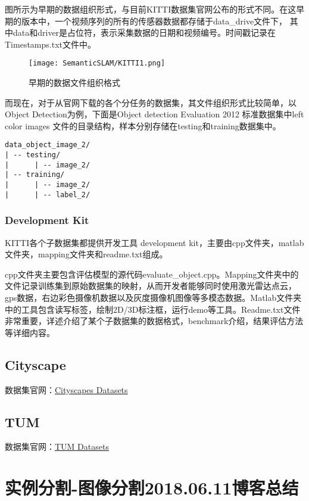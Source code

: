 图所示为早期的数据组织形式，与目前KITTI数据集官网公布的形式不同。在这早期的版本中，一个视频序列的所有的传感器数据都存储于data\_drive文件下， 其中data和driver是占位符，表示采集数据的日期和视频编号。时间戳记录在Timestamps.txt文件中。

\begin{figure}[!hbtp]
\centering
\texttt{[image: SemanticSLAM/KITTI1.png]}
\caption{早期的数据文件组织格式}
\label{KITTI1}
\end{figure}

而现在，对于从官网下载的各个分任务的数据集，其文件组织形式比较简单，以Object Detection为例，下面是Object detection Evaluation 2012 标准数据集中left color images 文件的目录结构，样本分别存储在testing和training数据集中。

\begin{verbatim}
data_object_image_2/
| -- testing/
|      | -- image_2/
| -- training/
|      | -- image_2/
|      | -- label_2/
\end{verbatim}

\subsubsection{Development Kit}

KITTI各个子数据集都提供开发工具 development kit，主要由cpp文件夹，matlab文件夹，mapping文件夹和readme.txt组成。

cpp文件夹主要包含评估模型的源代码evaluate\_object.cpp。Mapping文件夹中的文件记录训练集到原始数据集的映射，从而开发者能够同时使用激光雷达点云，gps数据，右边彩色摄像机数据以及灰度摄像机图像等多模态数据。Matlab文件夹中的工具包含读写标签，绘制2D/3D标注框，运行demo等工具。Readme.txt文件非常重要，详述介绍了某个子数据集的数据格式，benchmark介绍，结果评估方法等详细内容。

\subsection{Cityscape}

数据集官网：\href{https://www.cityscapes-dataset.com/}{Cityscapes Datasets}



\subsection{TUM}

数据集官网：\href{https://vision.in.tum.de/data/datasets}{TUM Datasets}

\section{实例分割-图像分割2018.06.11博客总结}

